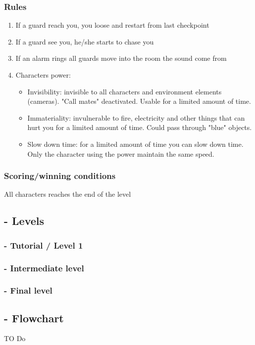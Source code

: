 \subsubsection{Rules}
\begin{enumerate}  
\item If a guard reach you, you loose and restart from last checkpoint
\item If a guard see you, he/she starts to chase you
\item If an alarm rings all guards move into the room the sound come from
\item Characters power: 	\begin{itemize}
					\item Invisibility: invisible to all characters and environment elements (cameras). "Call mates" deactivated. Usable for a limited amount of time.
					\item Immateriality: invulnerable to fire, electricity and other things that can hurt you for a limited amount of time. Could pass through "blue" objects.
					\item Slow down time: for a limited amount of time you can slow down time. Only the character using the power maintain the same speed. 
					\end{itemize}
\end{enumerate}

\subsubsection{Scoring/winning conditions}
All characters reaches the end of the level

\subsection{- Levels}
\subsubsection{- Tutorial / Level 1}
\subsubsection{- Intermediate level}
\subsubsection{- Final level}

\subsection{- Flowchart}
TO Do
